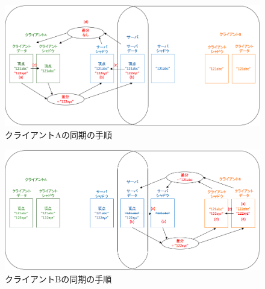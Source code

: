 \begin{figure}[htbp]
  \begin{center}
    \includegraphics[scale=0.3]{images/sycle1}
    \caption{クライアントAの同期の手順}
    \label{sycle1}
  \end{center}
\end{figure}
\begin{figure}[htbp]
  \begin{center}
    \includegraphics[scale=0.3]{images/sycle2}
    \caption{クライアントBの同期の手順}
    \label{sycle2}
  \end{center}
\end{figure}

